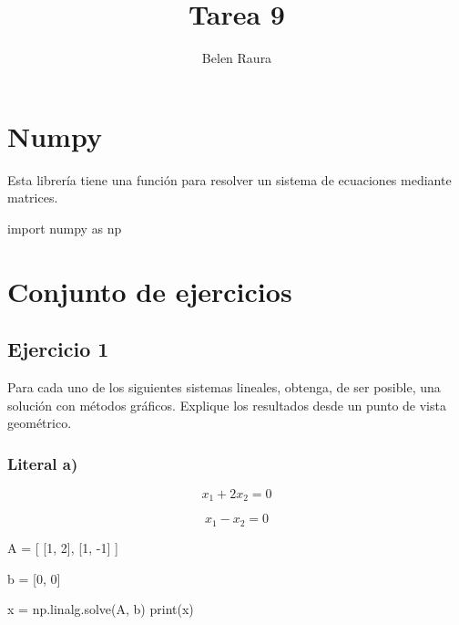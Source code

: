 \documentclass[
  letterpaper,
  DIV=11,
  numbers=noendperiod]{scrartcl}
\title{Tarea 9}
\author{Belen Raura}
\date{}
\newenvironment{Shaded}{\begin{snugshade}}{\end{snugshade}}
\newcommand{\BuiltInTok}[1]{\textcolor[rgb]{0.00,0.23,0.31}{#1}}
\newcommand{\DecValTok}[1]{\textcolor[rgb]{0.68,0.00,0.00}{#1}}
\newcommand{\ImportTok}[1]{\textcolor[rgb]{0.00,0.46,0.62}{#1}}
\newcommand{\NormalTok}[1]{\textcolor[rgb]{0.00,0.23,0.31}{#1}}
\newcommand{\OperatorTok}[1]{\textcolor[rgb]{0.37,0.37,0.37}{#1}}
\renewcommand*\contentsname{Tabla de contenidos}
\newcommand\contentsname{Tabla de contenidos}
\begin{document}
\maketitle

\renewcommand*\contentsname{Tabla de Contenidos}
{
\hypersetup{linkcolor=}
\setcounter{tocdepth}{3}
\tableofcontents
}

\section{Numpy}\label{numpy}

Esta librería tiene una función para resolver un sistema de ecuaciones
mediante matrices.

\begin{Shaded}
\begin{Highlighting}[]
\ImportTok{import}\NormalTok{ numpy }\ImportTok{as}\NormalTok{ np}
\end{Highlighting}
\end{Shaded}

\section{Conjunto de ejercicios}\label{conjunto-de-ejercicios}

\subsection{Ejercicio 1}\label{ejercicio-1}

Para cada uno de los siguientes sistemas lineales, obtenga, de ser
posible, una solución con métodos gráficos. Explique los resultados
desde un punto de vista geométrico.

\subsubsection{Literal a)}\label{literal-a}

\[x_1 + 2x_2 = 0\]

\[x_1 - x_2 = 0\]

\begin{Shaded}
\begin{Highlighting}[]

\NormalTok{A }\OperatorTok{=}\NormalTok{ [}
\NormalTok{    [}\DecValTok{1}\NormalTok{, }\DecValTok{2}\NormalTok{],}
\NormalTok{    [}\DecValTok{1}\NormalTok{, }\OperatorTok{{-}}\DecValTok{1}\NormalTok{]}
\NormalTok{]}

\NormalTok{b }\OperatorTok{=}\NormalTok{ [}\DecValTok{0}\NormalTok{, }\DecValTok{0}\NormalTok{]}

\NormalTok{x }\OperatorTok{=}\NormalTok{ np.linalg.solve(A, b)}
\BuiltInTok{print}\NormalTok{(x)}
\end{Highlighting}
\end{Shaded}
\end{document}

